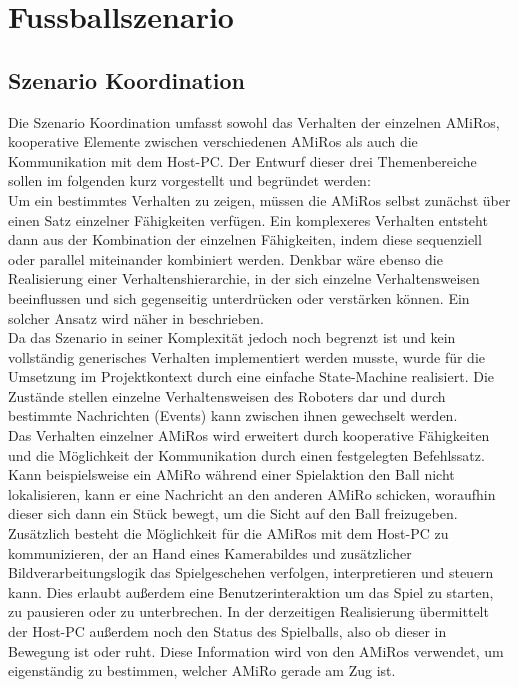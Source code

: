 \chapter{Fussballszenario} \label{kap:Fussballszenario} %

\section{Szenario Koordination}  %

Die Szenario Koordination umfasst sowohl das Verhalten der einzelnen AMiRos, kooperative Elemente zwischen verschiedenen AMiRos als auch die Kommunikation mit dem Host-PC. Der Entwurf dieser drei Themenbereiche sollen im folgenden kurz vorgestellt und begründet werden:\\
Um ein bestimmtes Verhalten zu zeigen, müssen die AMiRos selbst zunächst über einen Satz einzelner Fähigkeiten verfügen. Ein komplexeres Verhalten entsteht dann aus der Kombination der einzelnen Fähigkeiten, indem diese sequenziell oder parallel miteinander kombiniert werden. Denkbar wäre ebenso die Realisierung einer Verhaltenshierarchie, in der sich einzelne Verhaltensweisen beeinflussen und sich gegenseitig unterdrücken oder verstärken können. Ein solcher Ansatz wird näher in \cite{Brooks:1986} beschrieben.\\
Da das Szenario in seiner Komplexität jedoch noch begrenzt ist und kein vollständig generisches Verhalten implementiert werden musste, wurde für die Umsetzung im Projektkontext durch eine einfache State-Machine realisiert. Die Zustände stellen einzelne Verhaltensweisen des Roboters dar und durch bestimmte Nachrichten (Events) kann zwischen ihnen gewechselt werden.\\
Das Verhalten einzelner AMiRos wird erweitert durch kooperative Fähigkeiten und die Möglichkeit der Kommunikation durch einen festgelegten Befehlssatz. Kann beispielsweise ein AMiRo während einer Spielaktion den Ball nicht lokalisieren, kann er eine Nachricht an den anderen AMiRo schicken, woraufhin dieser sich dann ein Stück bewegt, um die Sicht auf den Ball freizugeben.\\
Zusätzlich besteht die Möglichkeit für die AMiRos mit dem Host-PC zu kommunizieren, der an Hand eines Kamerabildes und zusätzlicher Bildverarbeitungslogik das Spielgeschehen verfolgen, interpretieren und steuern kann. Dies erlaubt außerdem eine Benutzerinteraktion um das Spiel zu starten, zu pausieren oder zu unterbrechen. In der derzeitigen Realisierung übermittelt der Host-PC außerdem noch den Status des Spielballs, also ob dieser in Bewegung ist oder ruht. Diese Information wird von den AMiRos verwendet, um eigenständig zu bestimmen, welcher AMiRo gerade am Zug ist.


